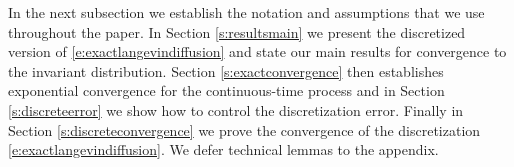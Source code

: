 In the next subsection we establish the notation and assumptions that we use throughout the paper. In Section \ref{s:resultsmain} we present the discretized version of \eqref{e:exactlangevindiffusion} and state our main results for convergence to the invariant distribution. Section \ref{s:exactconvergence} then establishes exponential convergence for the continuous-time process and in Section \ref{s:discreteerror} we show how to control the discretization error. Finally in Section \ref{s:discreteconvergence} we prove the convergence of the discretization \eqref{e:exactlangevindiffusion}. We defer technical lemmas to the appendix.